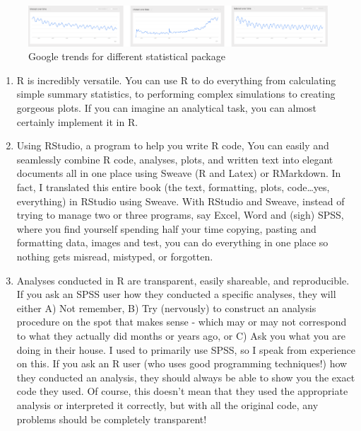\documentclass[
]{book}
\begin{document}
\begin{figure}

{\centering \includegraphics[width=12.76in]{images/googletrends} 

}

\caption{Google trends for different statistical package}\label{fig:googletrend}
\end{figure}

\begin{enumerate}
\def\labelenumi{\arabic{enumi}.}
\setcounter{enumi}{2}
\item
  R is incredibly versatile. You can use R to do everything from calculating simple summary statistics, to performing complex simulations to creating gorgeous plots. If you can imagine an analytical task, you can almost certainly implement it in R.
\item
  Using RStudio, a program to help you write R code, You can easily and seamlessly combine R code, analyses, plots, and written text into elegant documents all in one place using Sweave (R and Latex) or RMarkdown. In fact, I translated this entire book (the text, formatting, plots, code\ldots yes, everything) in RStudio using Sweave. With RStudio and Sweave, instead of trying to manage two or three programs, say Excel, Word and (sigh) SPSS, where you find yourself spending half your time copying, pasting and formatting data, images and test, you can do everything in one place so nothing gets misread, mistyped, or forgotten.
\item
  Analyses conducted in R are transparent, easily shareable, and reproducible. If you ask an SPSS user how they conducted a specific analyses, they will either A) Not remember, B) Try (nervously) to construct an analysis procedure on the spot that makes sense - which may or may not correspond to what they actually did months or years ago, or C) Ask you what you are doing in their house. I used to primarily use SPSS, so I speak from experience on this. If you ask an R user (who uses good programming techniques!) how they conducted an analysis, they should always be able to show you the exact code they used. Of course, this doesn't mean that they used the appropriate analysis or interpreted it correctly, but with all the original code, any problems should be completely transparent!
\end{enumerate}
\end{document}

